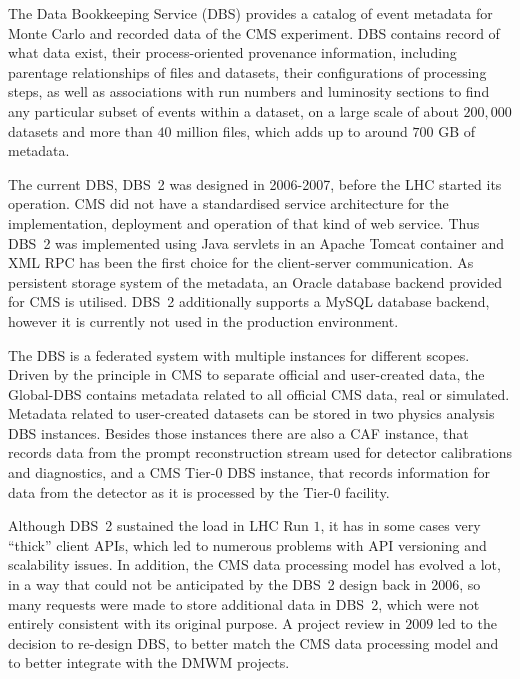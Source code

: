 The Data Bookkeeping Service (DBS) \cite{DBS} provides a catalog of event metadata for Monte Carlo and recorded data of the CMS experiment. DBS contains record of what data exist, their process-oriented provenance information, including parentage relationships of files and datasets, their configurations of processing steps, as well as associations with run numbers and luminosity sections to find any particular subset of events within a dataset, on a large scale of about $200,000$ datasets and more than $40$ million files, which adds up to around $700$ GB of metadata.

The current DBS, DBS~2 \cite{DBS2} was designed in 2006-2007, before the LHC started its operation. CMS did not have a standardised service architecture for the implementation, deployment and operation of that kind of web service. Thus DBS~2 was implemented using Java servlets in an Apache Tomcat container and XML RPC has been the first choice for the client-server communication. As  persistent storage system of the metadata, an Oracle database backend provided for CMS \cite{CMSDBs} is utilised. DBS~2 additionally supports a MySQL database backend, however it is currently not used in the production environment.

The DBS is a federated system with multiple instances for different scopes. Driven by the principle in CMS to separate official and user-created data, the Global-DBS contains metadata related to all official CMS data, real or simulated. Metadata related to user-created datasets can be stored in two physics analysis DBS instances. Besides those instances there are also a CAF instance, that records data from the prompt reconstruction stream used for detector calibrations and diagnostics, and a CMS Tier-0 DBS instance, that records information for data from the detector as it is processed by the Tier-0 facility.

Although DBS~2 sustained the load in LHC Run $1$, it has in some cases very ``thick'' client APIs, which  led to numerous problems with API versioning and scalability issues. In addition, the CMS data processing model has evolved a lot, in a way that could not be anticipated by the DBS~2 design back in $2006$, so many requests were made to store additional data in DBS~2, which were not entirely consistent with its original purpose. A project review in $2009$ led to the decision to re-design DBS, to better match the CMS data processing model and to better integrate with the DMWM projects.

